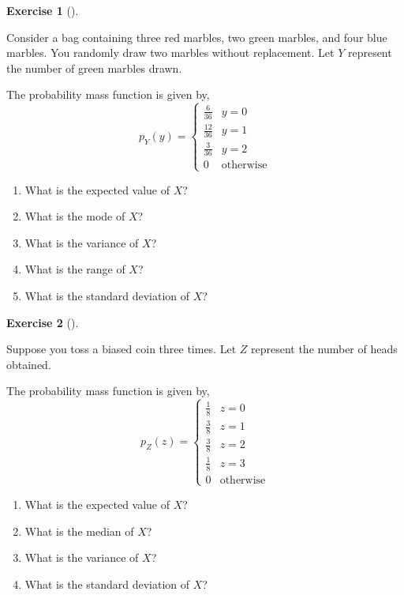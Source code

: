 \documentclass[
  letterpaper,
  DIV=11,
  numbers=noendperiod]{scrreprt}
\providecommand{\tightlist}{%
  \setlength{\itemsep}{0pt}\setlength{\parskip}{0pt}}\usepackage{longtable,booktabs,array}
\theoremstyle{definition}
\newtheorem{exercise}{Exercise}[chapter]
\theoremstyle{definition}
\theoremstyle{definition}
\theoremstyle{remark}
\begin{document}
\begin{exercise}[]\protect\hypertarget{exr-6.12}{}\label{exr-6.12}

Consider a bag containing three red marbles, two green marbles, and four
blue marbles. You randomly draw two marbles without replacement. Let
\(Y\) represent the number of green marbles drawn.

The probability mass function is given by, \[
p_Y(y) = \begin{cases} 
\frac{6}{36} & y = 0 \\
\frac{12}{36} & y = 1 \\
\frac{3}{36} & y = 2 \\
0 & \text{otherwise}
\end{cases}
\]

\begin{enumerate}
\def\labelenumi{\alph{enumi}.}
\tightlist
\item
  What is the expected value of \(X\)?
\item
  What is the mode of \(X\)?
\item
  What is the variance of \(X\)?
\item
  What is the range of \(X\)?
\item
  What is the standard deviation of \(X\)?
\end{enumerate}

\end{exercise}

\begin{exercise}[]\protect\hypertarget{exr-6.13}{}\label{exr-6.13}

Suppose you toss a biased coin three times. Let \(Z\) represent the
number of heads obtained.

The probability mass function is given by, \[
p_Z(z) = \begin{cases} 
\frac{1}{8} & z = 0 \\
\frac{3}{8} & z = 1 \\
\frac{3}{8} & z = 2 \\
\frac{1}{8} & z = 3 \\
0 & \text{otherwise}
\end{cases}
\]

\begin{enumerate}
\def\labelenumi{\alph{enumi}.}
\tightlist
\item
  What is the expected value of \(X\)?
\item
  What is the median of \(X\)?
\item
  What is the variance of \(X\)?
\item
  What is the standard deviation of \(X\)?
\end{enumerate}

\end{exercise}
\end{document}
